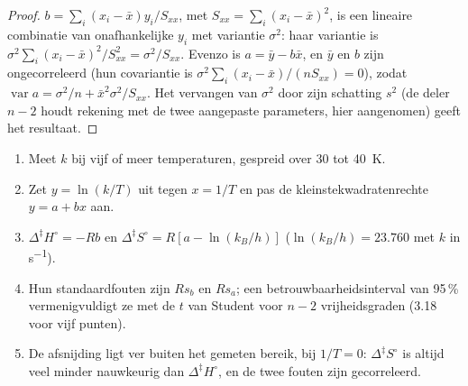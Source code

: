 \begin{proof}
$b = \sum_i(x_i - \bar x)y_i/S_{xx}$, met $S_{xx} = \sum_i(x_i - \bar x)^2$,
is een lineaire combinatie van onafhankelijke $y_i$ met variantie $\sigma^2$: haar variantie is $\sigma^2\sum_i(x_i - \bar x)^2/S_{xx}^2 = \sigma^2/S_{xx}$.
Evenzo is $a = \bar y - b\bar x$, en $\bar y$ en $b$ zijn ongecorreleerd
(hun covariantie is
$\sigma^2\sum_i(x_i - \bar x)/(nS_{xx}) = 0$), zodat $\operatorname{var}a = \sigma^2/n + \bar x^2\sigma^2/S_{xx}$. Het vervangen van $\sigma^2$
door zijn schatting $s^2$ (de deler $n - 2$ houdt rekening met de twee
aangepaste parameters, hier aangenomen) geeft het resultaat.
\end{proof}

\begin{method}\label{met:b3:rate-theories:eyring-plot}
\begin{enumerate}
  \item Meet $k$ bij vijf of meer temperaturen, gespreid over 30 tot \qty{40}{K}.
  \item Zet $y = \ln(k/T)$ uit tegen $x = 1/T$ en pas de kleinstekwadratenrechte $y = a + bx$ aan.
  \item $\Delta^{\ddagger}H^\circ = -Rb$ en $\Delta^{\ddagger}S^\circ = R[a - \ln(k_B/h)]$ ($\ln(k_B/h) = 23.760$ met $k$ in
        \unit{s^{-1}}).
  \item Hun standaardfouten zijn $Rs_b$ en $Rs_a$; een
        betrouwbaarheidsinterval van 95\,\% vermenigvuldigt ze met de $t$
        van Student voor $n - 2$ vrijheidsgraden (3.18 voor vijf punten).
  \item De afsnijding ligt ver buiten het gemeten bereik, bij $1/T = 0$: $\Delta^{\ddagger}S^\circ$
        is altijd veel minder nauwkeurig dan $\Delta^{\ddagger}H^\circ$, en de
        twee fouten zijn gecorreleerd.
\end{enumerate}
\end{method}

